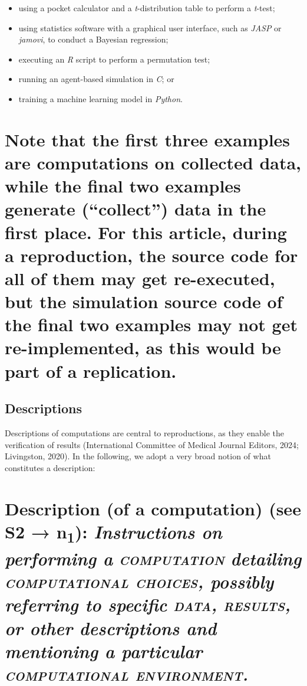 \documentclass[authordate, empirical]{jote-new-article}
\begin{document}
	\begin{itemize}


		\item using a pocket calculator and a \emph{t}-distribution table to perform a \emph{t}-test;



		\item using statistics software with a graphical user interface, such as \emph{JASP} or \emph{jamovi}, to conduct a Bayesian regression;



		\item executing an \emph{R} script to perform a permutation test;



		\item running an agent-based simulation in \emph{C}; or



		\item training a machine learning model in \emph{Python}.


	\end{itemize}

	\section{Note that the first three examples are computations on collected data, while the final two examples generate (“collect”) data in the first place. For this article, during a reproduction, the source code for all of them may get re-executed, but the simulation source code of the final two examples may not get re-implemented, as this would be part of a replication.}



	\subsection{Descriptions}



	Descriptions of computations are central to reproductions, as they enable the verification of results (International Committee of Medical Journal Editors, 2024; Livingston, 2020). In the following, we adopt a very broad notion of what constitutes a description:



	\section{\textbf{Description (of a computation)} (see S2 → n\textsubscript{1}): \emph{Instructions on performing a }\textsc{\emph{computation}}\emph{ detailing }\textsc{\emph{computational choices}}\emph{, possibly referring to specific }\textsc{\emph{data}}\emph{, }\textsc{\emph{results}}\emph{, or other descriptions and mentioning a particular }\textsc{\emph{computational environment}}\emph{.}}
\end{document}
